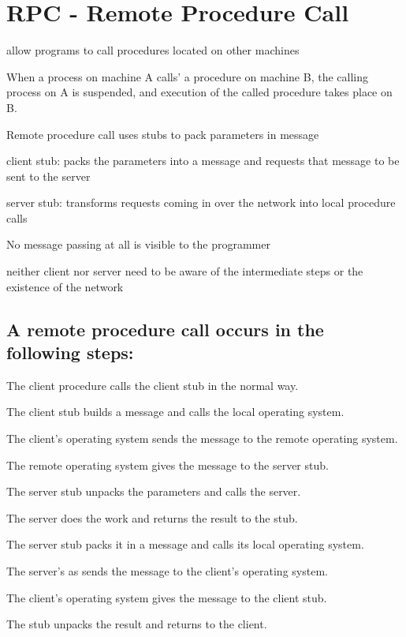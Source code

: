 \documentclass[ngerman,a4paper]{report}
\begin{document}
\section{RPC - Remote Procedure Call}

\begin{compactitem}
	\item allow programs to call procedures located on other machines
	\item When a process on machine A calls' a procedure on machine B, the calling process on A is suspended, and execution of the called procedure takes place on B.
	\item Remote procedure call uses stubs to pack parameters in message
	\item client stub: packs the parameters into a message and requests that message to be sent to the server
	\item server stub: transforms requests coming in over the network into local procedure calls
	\item No message passing at all is visible to the programmer
	\item neither client nor server need to be aware of the intermediate steps or the existence of the network
\end{compactitem}

\subsection*{A remote procedure call occurs in the following steps:}

\begin{compactenum}
	\item The client procedure calls the client stub in the normal way.
	\item The client stub builds a message and calls the local operating system.
	\item The client's operating system sends the message to the remote operating system.
	\item The remote operating system gives the message to the server stub.
	\item The server stub unpacks the parameters and calls the server.
	\item The server does the work and returns the result to the stub.
	\item The server stub packs it in a message and calls its local operating system.
	\item The server's as sends the message to the client's operating system.
	\item The client's operating system gives the message to the client stub.
	\item The stub unpacks the result and returns to the client.
\end{compactenum}
\end{document}
